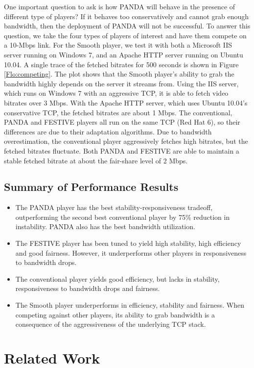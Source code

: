 \documentclass[conference]{IEEEtran}
\theoremstyle{plain}
\theoremstyle{definition}
\theoremstyle{plain}
\theoremstyle{plain}
\begin{document}
One important question to ask is how PANDA will behave in the presence
of different type of players? If it behaves too conservatively and
cannot grab enough bandwidth, then the deployment of PANDA will not
be successful. To answer this question, we take the four types of
players of interest and have them compete on a 10-Mbps link. For the
Smooth player, we test it with both a Microsoft IIS server running
on Windows 7, and an Apache HTTP server running on Ubuntu 10.04. A
single trace of the fetched bitrates for 500 seconds is shown in Figure
\ref{Flo:competing}. The plot shows that the Smooth player's ability
to grab the bandwidth highly depends on the server it streams from.
Using the IIS server, which runs on Windows 7 with an aggressive TCP,
it is able to fetch video bitrates over 3 Mbps. With the Apache HTTP
server, which uses Ubuntu 10.04's conservative TCP, the fetched bitrates
are about 1 Mbps. The conventional, PANDA and FESTIVE players all
run on the same TCP (Red Hat 6), so their differences are due to their
adaptation algorithms. Due to bandwidth overestimation, the conventional
player aggressively fetches high bitrates, but the fetched bitrates
fluctuate. Both PANDA and FESTIVE are able to maintain a stable fetched
bitrate at about the fair-share level of 2 Mbps.


\subsection{Summary of Performance Results}
\begin{itemize}
\item The PANDA player has the best stability-responsiveness tradeoff, outperforming
the second best conventional player by 75\% reduction in instability.
PANDA also has the best bandwidth utilization.
\item The FESTIVE player has been tuned to yield high stability, high efficiency
and good fairness. However, it underperforms other players in responsiveness
to bandwidth drops.
\item The conventional player yields good efficiency, but lacks in stability,
responsiveness to bandwidth drops and fairness.
\item The Smooth player underperforms in efficiency, stability and fairness.
When competing against other players, its ability to grab bandwidth
is a consequence of the aggressiveness of the underlying TCP stack.
\end{itemize}

\section{Related Work\label{sec:related} }
\end{document}
